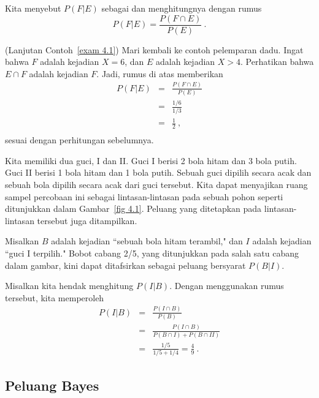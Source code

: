 Kita menyebut $P(F|E)$ sebagai 
dan menghitungnya dengan rumus
$$
P(F|E) = \frac {P(F \cap E)}{P(E)}\ .
$$

\begin{example}(Lanjutan Contoh~\ref{exam 4.1}){\label{exam 4.3}}
Mari kembali ke contoh pelemparan dadu.  Ingat bahwa $F$ adalah kejadian $X = 6$, dan
$E$ adalah kejadian $X > 4$.  Perhatikan bahwa $E \cap F$ adalah kejadian $F$.  Jadi, rumus di atas memberikan
\begin{eqnarray*}
P(F|E) & = & \frac {P(F \cap E)}{P(E)} \\
& = & \frac {1/6}{1/3} \\
& = & \frac 12\ ,\\
\end{eqnarray*}
sesuai dengan perhitungan sebelumnya.
\end{example}

\begin{example}\label{exam 4.4}
Kita memiliki dua guci, I dan II.  Guci I berisi 2 bola hitam dan 3 bola putih. 
Guci II berisi 1 bola hitam dan 1 bola putih.  Sebuah guci dipilih secara acak dan sebuah bola
dipilih secara acak dari guci tersebut.  Kita dapat menyajikan ruang sampel percobaan ini sebagai lintasan-lintasan
pada sebuah pohon seperti ditunjukkan dalam Gambar~\ref{fig 4.1}. Peluang yang ditetapkan pada lintasan-lintasan tersebut
juga ditampilkan.  
\par
Misalkan $B$ adalah kejadian ``sebuah bola hitam terambil," dan $I$ adalah kejadian ``guci I
terpilih."  Bobot cabang 2/5, yang ditunjukkan pada salah satu cabang dalam gambar, kini dapat
ditafsirkan sebagai peluang bersyarat $P(B|I)$.


\par
Misalkan kita hendak menghitung $P(I|B)$.  Dengan menggunakan rumus tersebut, kita memperoleh
\begin{eqnarray*}
P(I|B) & = & \frac {P(I \cap B)}{P(B)} \\
       & = & \frac {P(I \cap B)}{P(B \cap I) + P(B \cap II)} \\
       & = & \frac {1/5}{1/5 + 1/4} = \frac 49\ .
\end{eqnarray*}
\end{example}

\subsection*{Peluang Bayes}

